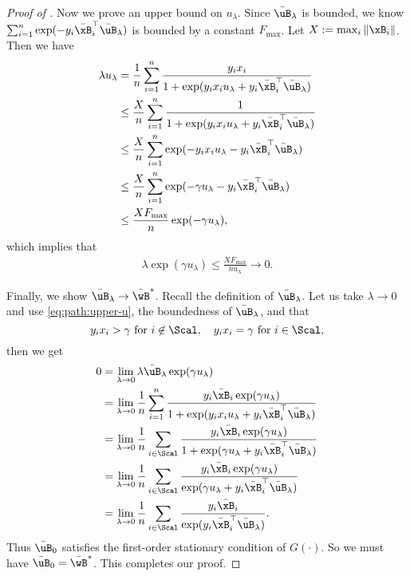 \documentclass[11pt]{article}
\begin{document}
\begin{proof}[Proof of ]
Now we prove an upper bound on $u_{\lambda}$.
Since $\bar\uB_{\lambda}$ is bounded, we know $\sum_{i=1}^n \exp(-y_i \bar\xB_i^\top \bar\uB_{\lambda} )$ is bounded by a constant $F_{\max}$. Let $X:=\max_{i}\|\xB_i\|$.
Then we have 
\begin{align*}
    \lambda    u_{\lambda} &=  \frac{1}{n}\sum_{i=1}^n \frac{y_ix_i}{1+\exp(y_i x_i u_{\lambda} + y_i \bar\xB_i^\top \bar\uB_{\lambda} )} \\
    &\le  \frac{X}{n}\sum_{i=1}^n \frac{1}{1+\exp(y_i x_i u_{\lambda} + y_i \bar\xB_i^\top \bar\uB_{\lambda} )} \\
    &\le  \frac{X}{n}\sum_{i=1}^n \exp(-y_i x_i u_{\lambda} - y_i \bar\xB_i^\top \bar\uB_{\lambda} ) \\
    &\le \frac{X}{n}\sum_{i=1}^n \exp(-\gamma u_{\lambda} - y_i \bar\xB_i^\top \bar\uB_{\lambda} )\\
     &\le \frac{X F_{\max}}{n} \exp(-\gamma u_{\lambda}),
\end{align*}
which implies that 
\begin{align}
    \lambda  \exp(\gamma u_{\lambda}) \le \frac{X F_{\max}}{n u_{\lambda}} \to 0.\label{eq:path:upper-u}
\end{align}

Finally, we show $\bar\uB_{\lambda}\to\bar\wB^*$. Recall the definition of $\bar\uB_{\lambda}$. Let us take $\lambda\to 0$ and use \cref{eq:path:upper-u}, the boundedness of $\bar\uB_{\lambda}$, and that 
\[y_ix_i> \gamma \ \text{for}\  i\not\in\Scal,\quad y_ix_i=\gamma\ \text{for}\  i\in\Scal,\]
then we get 
\begin{align*}
0 &=
    \lim_{\lambda\to 0}\lambda\bar\uB_{\lambda}  \exp(\gamma u_{\lambda}) \\
    & =  \lim_{\lambda\to 0}\frac{1}{n}\sum_{i=1}^n \frac{y_i\bar \xB_i\exp(\gamma u_{\lambda}) }{1+\exp(y_i x_i u_{\lambda} + y_i \bar\xB_i^\top \bar\uB_{\lambda} )} \\
    &= \lim_{\lambda\to 0}\frac{1}{n}\sum_{i\in\Scal} \frac{y_i\bar \xB_i \exp(\gamma u_{\lambda}) }{1+\exp(\gamma u_{\lambda} + y_i \bar\xB_i^\top \bar\uB_{\lambda} )} \\
    &= \lim_{\lambda\to 0}\frac{1}{n}\sum_{i\in\Scal} \frac{y_i\bar \xB_i \exp(\gamma u_{\lambda}) }{\exp(\gamma u_{\lambda} + y_i \bar\xB_i^\top \bar\uB_{\lambda} )} \\
    &= \lim_{\lambda\to 0}\frac{1}{n}\sum_{i\in\Scal} \frac{y_i\bar \xB_i }{\exp( y_i \bar\xB_i^\top \bar\uB_{\lambda} )}.
\end{align*}
Thus $\bar\uB_{0}$ satisfies the first-order stationary condition of $G(\cdot)$. So we must have $\bar\uB_{0} = \bar\wB^*$. This completes our proof.
\end{proof}
\end{document}
